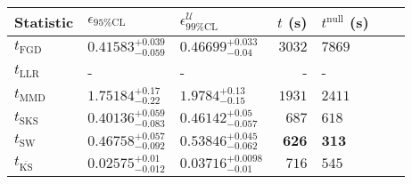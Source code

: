 \begin{tabular}{l|llr|llr}
	Statistic & $\epsilon_{95\%\mathrm{CL}}$ & $\epsilon^    {\mathcal{U}}_{99\%\mathrm{CL}}$ & $t$ (s) & $t^{\mathrm{null}}$ (s) \\
	\midrule
	$t_{\mathrm{FGD}}$ & $0.41583_{-0.059}^{+0.039}$ & $0.46699_{-0.04}^{+0.033}$ & $3032$ & $7869$ \\
	$t_{\mathrm{LLR}}$ & - & - & - & - \\
	$t_{\mathrm{MMD}}$ & $1.75184_{-0.22}^{+0.17}$ & $1.9784_{-0.15}^{+0.13}$ & $1931$ & $2411$ \\
	$t_{\mathrm{SKS}}$ & $0.40136_{-0.083}^{+0.059}$ & $0.46142_{-0.057}^{+0.05}$ & $687$ & $618$ \\
	$t_{\mathrm{SW}}$ & $0.46758_{-0.092}^{+0.057}$ & $0.53846_{-0.062}^{+0.045}$ & ${\mathbf{626}}$ & ${\mathbf{313}}$ \\
	$t_{\overline{\mathrm{KS}}}$ & ${\mathbf{0.02575_{-0.012}^{+0.01}}}$ & ${\mathbf{0.03716_{-0.01}^{+0.0098}}}$ & $716$ & $545$ \\
	\bottomrule
\end{tabular}